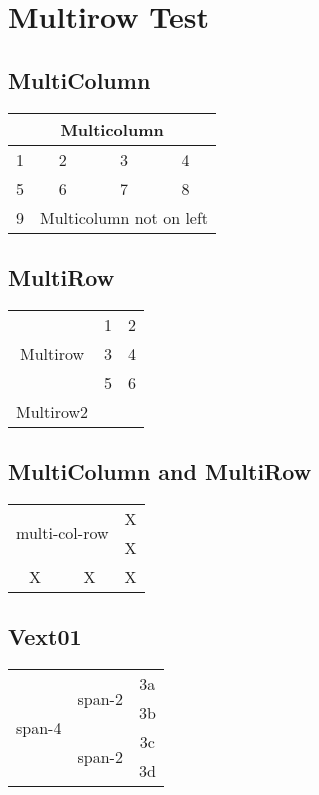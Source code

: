 \documentclass{article}%
\begin{document}
%
\section*{Multirow Test}%
\subsection*{MultiColumn}%
\begin{tabular}{|c|c|c|c|}%
\hline%
\multicolumn{4}{|c|}{Multicolumn}\\%
\hline%
1&2&3&4\\%
\hline%
5&6&7&8\\%
\hline%
9&\multicolumn{3}{|c|}{Multicolumn not on left}\\%
\hline%
\end{tabular}

%
\subsection*{MultiRow}%
\begin{tabular}{|c|c|c|}%
\hline%
\multirow{3}{*}{Multirow}&1&2\\%
\cline{2-3}%
&3&4\\%
\cline{2-3}%
&5&6\\%
\hline%
\multirow{3}{*}{Multirow2}&&\\%
&&\\%
&&\\%
\hline%
\end{tabular}

%
\subsection*{MultiColumn and MultiRow}%
\begin{tabular}{|c|c|c|}%
\hline%
\multicolumn{2}{|c|}{\multirow{2}{*}{multi{-}col{-}row}}&X\\%
\multicolumn{2}{|c|}{}&X\\%
\hline%
X&X&X\\%
\hline%
\end{tabular}

%
\subsection*{Vext01}%
\begin{tabular}{|c|c|c|}%
\hline%
\multirow{4}{*}{span{-}4}&\multirow{2}{*}{span{-}2}&3a\\%
\cline{3-3}%
&&3b\\%
\cline{2-3}%
&\multirow{2}{*}{span{-}2}&3c\\%
\cline{3-3}%
&&3d\\%
\hline%
\end{tabular}

%
\end{document}
